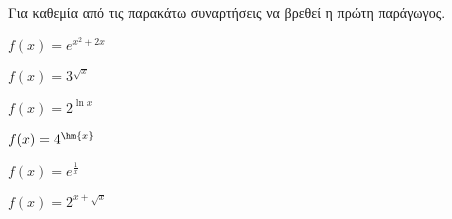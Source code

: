 Για καθεμία από τις παρακάτω συναρτήσεις να βρεθεί η πρώτη παράγωγος.
\begin{multicols}{2}
\begin{alist}
\item $ f(x)=e^{x^2+2x} $
\item $ f(x)=3^{\sqrt{x}} $
\item $ f(x)=2^{\ln{x}} $
\item $ f(x)=4^{\hm{x}} $
\item $ f(x)=e^{\frac{1}{x}} $
\item $ f(x)=2^{x+\sqrt{x}} $
\end{alist}
\end{multicols}
